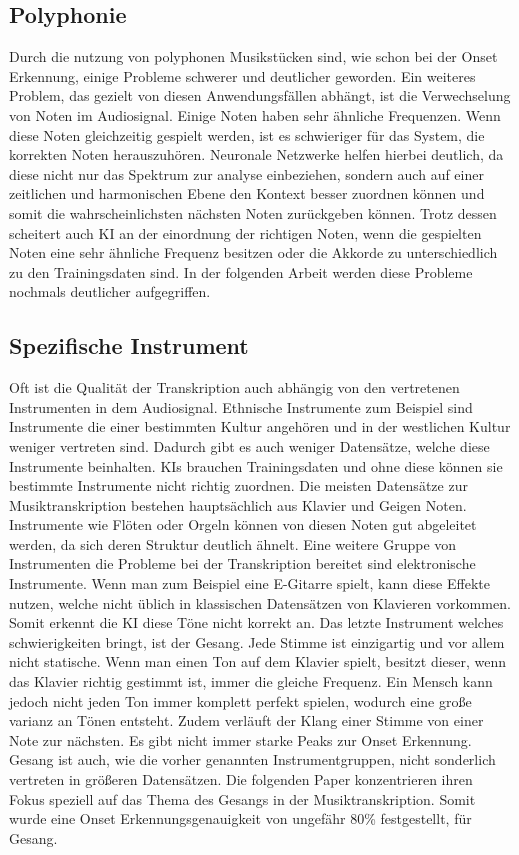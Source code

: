 \subsection{Polyphonie}
Durch die nutzung von polyphonen Musikstücken sind, wie schon bei der Onset Erkennung,
einige Probleme schwerer und deutlicher geworden.
Ein weiteres Problem, das gezielt von diesen Anwendungsfällen abhängt, ist die Verwechselung von Noten im Audiosignal.
Einige Noten haben sehr ähnliche Frequenzen.
Wenn diese Noten gleichzeitig gespielt werden, ist es schwieriger für das System, die korrekten Noten herauszuhören.
Neuronale Netzwerke helfen hierbei deutlich, da diese nicht nur das Spektrum zur analyse einbeziehen,
sondern auch auf einer zeitlichen und harmonischen Ebene den Kontext besser zuordnen können
und somit die wahrscheinlichsten nächsten Noten zurückgeben können.
Trotz dessen scheitert auch KI an der einordnung der richtigen Noten, wenn die gespielten Noten
eine sehr ähnliche Frequenz besitzen oder die Akkorde zu unterschiedlich zu den Trainingsdaten sind.
In der folgenden Arbeit werden diese Probleme nochmals deutlicher aufgegriffen.
\cite{martak2022balancing}

\subsection{Spezifische Instrument}
Oft ist die Qualität der Transkription auch abhängig von den vertretenen Instrumenten in dem Audiosignal.
Ethnische Instrumente zum Beispiel sind Instrumente die einer bestimmten Kultur angehören
und in der westlichen Kultur weniger vertreten sind.
Dadurch gibt es auch weniger Datensätze, welche diese Instrumente beinhalten.
KIs brauchen Trainingsdaten und ohne diese können sie bestimmte Instrumente nicht richtig zuordnen.
Die meisten Datensätze zur Musiktranskription bestehen hauptsächlich aus Klavier und Geigen Noten.
Instrumente wie Flöten oder Orgeln können von diesen Noten gut abgeleitet werden,
da sich deren Struktur deutlich ähnelt.
Eine weitere Gruppe von Instrumenten die Probleme bei der Transkription bereitet sind elektronische Instrumente.
Wenn man zum Beispiel eine E-Gitarre spielt, kann diese Effekte nutzen,
welche nicht üblich in klassischen Datensätzen von Klavieren vorkommen.
Somit erkennt die KI diese Töne nicht korrekt an.
Das letzte Instrument welches schwierigkeiten bringt, ist der Gesang.
Jede Stimme ist einzigartig und vor allem nicht statische.
Wenn man einen Ton auf dem Klavier spielt, besitzt dieser,
wenn das Klavier richtig gestimmt ist, immer die gleiche Frequenz.
Ein Mensch kann jedoch nicht jeden Ton immer komplett perfekt spielen, wodurch eine große varianz an Tönen entsteht.
Zudem verläuft der Klang einer Stimme von einer Note zur nächsten.
Es gibt nicht immer starke Peaks zur Onset Erkennung.
Gesang ist auch, wie die vorher genannten Instrumentgruppen, nicht sonderlich vertreten in größeren Datensätzen.
Die folgenden Paper konzentrieren ihren Fokus speziell auf das Thema des Gesangs in der Musiktranskription.
\cite{gu2023deep,gu2024automatic}
Somit wurde eine Onset Erkennungsgenauigkeit von ungefähr 80\% festgestellt, für Gesang.

